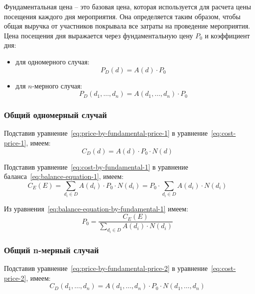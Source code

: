 Фундаментальная цена -- это базовая цена, которая используется для расчета цены посещения каждого дня мероприятия. Она определяется таким образом, чтобы общая выручка от участников покрывала все затраты на проведение мероприятия. Цена посещения дня выражается через фундаментальную цену $P_0$ и коэффициент дня:
\begin{itemize}[label=--]
	\item для одномерного случая:
	\begin{equation}
		P_D(d) = A(d) \cdot P_0
		\label{eq:price-by-fundamental-price-1}
	\end{equation}
	\item для $n$-мерного случая:
	\begin{equation}
		P_D(d_1, \dots, d_n) = A(d_1, \dots, d_n) \cdot P_0
		\label{eq:price-by-fundamental-price-2}
	\end{equation}
\end{itemize}  

\subsubsection{Общий одномерный случай}

Подставив уравнение~\ref{eq:price-by-fundamental-price-1} в уравнение~\ref{eq:cost-price-1}, имеем:
\begin{equation}
	C_D(d) = A(d) \cdot P_0 \cdot N(d)
	\label{eq:cost-by-fundamental-1}
\end{equation}

Подставив уравнение~\ref{eq:cost-by-fundamental-1} в уравнение баланса~\ref{eq:balance-equation-1}, имеем:
\begin{equation}
	C_E(E) = \sum_{d_i \in D}{A(d_i) \cdot P_0 \cdot N(d_i)} = P_0 \cdot \sum_{d_i \in D}{A(d_i) \cdot N(d_i)}
	\label{eq:balance-equation-by-fundamental-1}
\end{equation}

Из уравнения~\ref{eq:balance-equation-by-fundamental-1} имеем:
\begin{equation}
	P_0 = \frac{C_E(E)}{\sum_{d_i \in D}{A(d_i) \cdot N(d_i)}}
	\label{eq:fundamental-price-1}
\end{equation}

\subsubsection{Общий n-мерный случай}

Подставив уравнение~\ref{eq:price-by-fundamental-price-2} в уравнение~\ref{eq:cost-price-2}, имеем:
\begin{equation}
	C_D(d_1, \dots, d_n) = A(d_1, \dots, d_n) \cdot P_0 \cdot N(d_1, \dots, d_n)
	\label{eq:cost-by-fundamental-2}
\end{equation}

